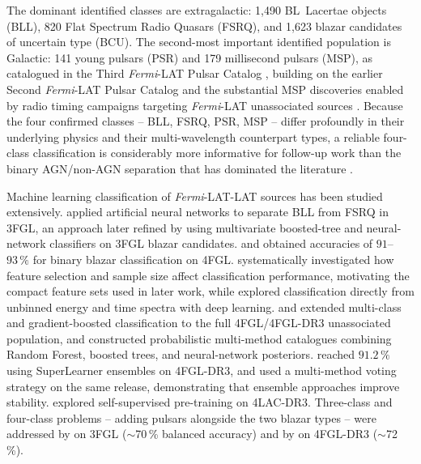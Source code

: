 \documentclass[fleqn,12pt]{article}
\newcommand{\fermi}{\textit{Fermi}-LAT}
\begin{document}
The dominant identified classes are extragalactic: 1,490 BL~Lacertae
objects (BLL), 820 Flat Spectrum Radio Quasars (FSRQ), and 1,623
blazar candidates of uncertain type (BCU). The second-most important
identified population is Galactic: 141 young pulsars (PSR) and 179
millisecond pulsars (MSP), as catalogued in the Third \fermi{} Pulsar
Catalog \citep{Smith2023}, building on the earlier Second \fermi{}
Pulsar Catalog \citep{Abdo2013} and the substantial MSP discoveries
enabled by radio timing campaigns targeting \fermi{} unassociated
sources \citep{Guillemot2016}. Because the four confirmed classes -- BLL,
FSRQ, PSR, MSP -- differ profoundly in their underlying physics and
their multi-wavelength counterpart types, a reliable four-class
classification is considerably more informative for follow-up work
than the binary AGN/non-AGN separation that has dominated the
literature \citep{Ackermann2012,Mirabal2012,Doert2014}.

Machine learning classification of \fermi{}-LAT sources has been
studied extensively. \citet{Chiaro2016} applied artificial neural
networks to separate BLL from FSRQ in 3FGL, an approach later refined
by \citet{Lefaucheur2017} using multivariate boosted-tree and
neural-network classifiers on 3FGL blazar candidates. \citet{Kang2019} and
\citet{Kovacevic2020} obtained accuracies of $91$--$93\,\%$ for
binary blazar classification on 4FGL. \citet{Luo2020} systematically
investigated how feature selection and sample size affect
classification performance, motivating the compact feature sets used
in later work, while \citet{Finke2021} explored classification
directly from unbinned energy and time spectra with deep learning.
\citet{Zhu2021} and \citet{CoronadoBlazquez2022} extended
multi-class and gradient-boosted classification to the full
4FGL/4FGL-DR3 unassociated population, and \citet{Bhat2022}
constructed probabilistic multi-method catalogues combining Random
Forest, boosted trees, and neural-network posteriors. \citet{Cooper2023} reached
$91.2\,\%$ using SuperLearner ensembles on 4FGL-DR3, and
\citet{Zhu2024} used a multi-method voting strategy on the same
release, demonstrating that ensemble approaches improve stability.
\citet{Bhatta2024} explored self-supervised pre-training on 4LAC-DR3.
Three-class and four-class problems -- adding pulsars alongside the
two blazar types -- were addressed by \citet{Saz_Parkinson2016} on
3FGL ($\sim$70\,\% balanced accuracy) and by \citet{Zhu2024} on
4FGL-DR3 ($\sim$72\,\%).
\end{document}
